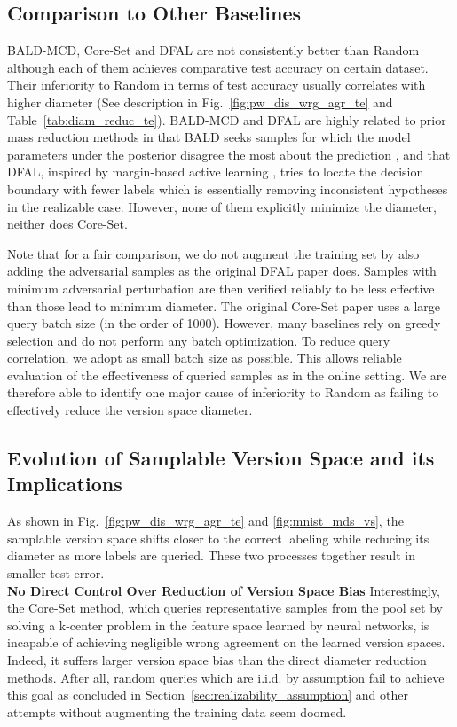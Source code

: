 \documentclass[runningheads, envcountsame, a4paper]{llncs}
\begin{document}
\subsection{Comparison to Other Baselines}
\label{sec:comparison_to_other_baselines}
BALD-MCD, Core-Set and DFAL are not consistently better than Random although each of them achieves comparative test accuracy on certain dataset. Their inferiority to Random in terms of test accuracy usually correlates with higher diameter (See description in Fig.~\ref{fig:pw_dis_wrg_agr_te} and Table~\ref{tab:diam_reduc_te}). BALD-MCD and DFAL are highly related to prior mass reduction methods in that BALD \cite{Houlsby11} seeks samples for which the model parameters under the posterior disagree the most about the prediction \cite{Houlsby11}, and that DFAL, inspired by margin-based active learning \cite{Balcan07}, tries to locate the decision boundary with fewer labels which is essentially removing inconsistent hypotheses in the realizable case. However, none of them explicitly minimize the diameter, neither does Core-Set. 

Note that for a fair comparison, we do not augment the training set by also adding the adversarial samples as the original DFAL paper \cite{Ducoffe18} does. Samples with minimum adversarial perturbation are then verified reliably to be less effective than those lead to minimum diameter. The original Core-Set paper \cite{Sener18} uses a large query batch size (in the order of 1000). However, many baselines rely on greedy selection and do not perform any batch optimization. To reduce query correlation, we adopt as small batch size as possible. This allows reliable evaluation of the effectiveness of queried samples as in the online setting. We are therefore able to identify one major cause of inferiority to Random as failing to effectively reduce the version space diameter. 

\subsection{Evolution of Samplable Version Space and its Implications}
\label{sec:evolution_of_samplable_version_space_and_its_implications}
As shown in Fig.~\ref{fig:pw_dis_wrg_agr_te} and \ref{fig:mnist_mds_vs},
the samplable version space shifts closer to the correct labeling while reducing its diameter as more labels are queried. These two processes together result in smaller test error. \\

\noindent\textbf{No Direct Control Over Reduction of Version Space Bias}
\label{para:active_learning_algorithms_have_no_direct_control_over_reduction of_version_space_bias}
Interestingly, the Core-Set method, which queries representative samples from the pool set by solving a k-center problem in the feature space learned by neural networks, is incapable of achieving negligible wrong agreement on the learned version spaces. Indeed, it suffers larger version space bias than the direct diameter reduction methods. After all, random queries which are i.i.d. by assumption fail to achieve this goal as concluded in Section~\ref{sec:realizability_assumption} and other attempts without augmenting the training data seem doomed. \\
\end{document}
